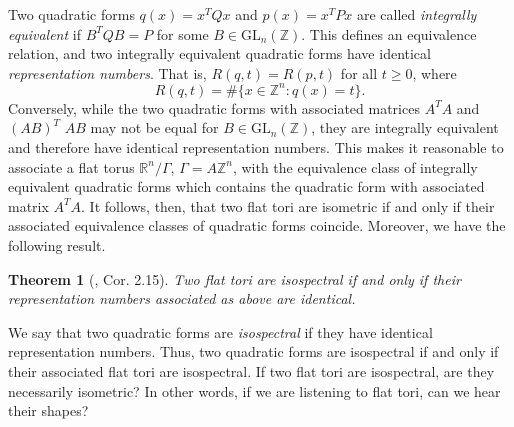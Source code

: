 \documentclass{amsart}
\newtheorem{theorem}{Theorem}[section]
\theoremstyle{definition}
\newcommand*{\GL}{\text{GL}}
\newcommand*{\R}{\mathbb{R}}
\newcommand*{\Z}{\mathbb{Z}}
\begin{document}
Two quadratic forms $q(x) = x^TQx$ and $p(x) = x^TPx$ are called \textit{integrally equivalent} if $B^TQB = P$ for some $B \in \GL_n(\Z)$. This defines an equivalence relation, and two integrally equivalent quadratic forms have identical \textit{representation numbers}. That is, $R(q,t) = R(p,t)$ for all $t \geq 0$, where 
\begin{equation*}
    R(q,t) = \#\{x \in \Z^n : q(x) = t\}.
\end{equation*}
Conversely, while the two quadratic forms with associated matrices $A^TA$ and $(AB)^T$ $AB$ may not be equal for $B \in \GL_n(\Z)$, they are integrally equivalent and therefore have identical representation numbers. This makes it reasonable to associate a flat torus $\R^n / \Gamma$, $\Gamma = A\Z^n$, with the equivalence class of integrally equivalent quadratic forms which contains the quadratic form with associated matrix $A^TA$. It follows, then, that two flat tori are isometric if and only if their associated equivalence classes of quadratic forms coincide. Moreover, we have the following result.

\begin{theorem}[\cite{nilsson2022isospectral}, Cor. 2.15]
    Two flat tori are isospectral if and only if their representation numbers associated as above are identical.
\end{theorem}
We say that two quadratic forms are \textit{isospectral} if they have identical representation numbers. Thus, two quadratic forms are isospectral if and only if their associated flat tori are isospectral.  If two flat tori are isospectral, are they necessarily isometric?  In other words, if we are listening to flat tori, can we hear their shapes?



\end{document}
